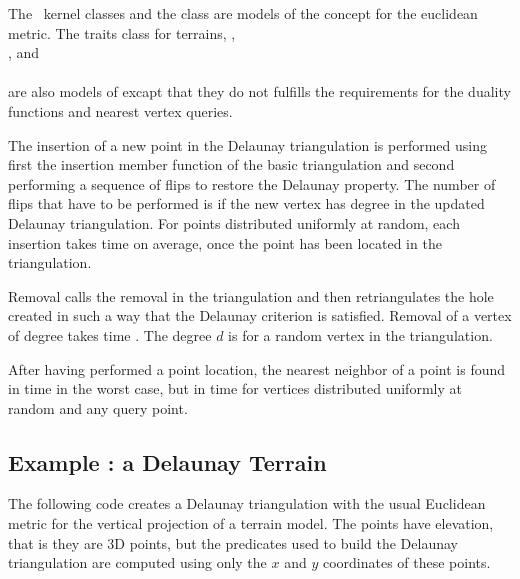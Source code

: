 The \cgal\  kernel classes 
 and the class 
are models of the concept 
for the euclidean metric.
The traits class for terrains,
,\\
, and\\
 \\
are also models of  
excapt that they do not fulfills 
the requirements for the duality functions and nearest vertex
queries.

The insertion of a new point in the Delaunay triangulation
is performed using first the insertion member function
of the basic triangulation and second 
performing a sequence of flips to restore the Delaunay property. 
The number of flips that have to be performed is 
if the new vertex has degree  in the updated
Delaunay triangulation. For
points distributed uniformly at random, 
each insertion takes time  on
average, once the point has been located in the triangulation.

Removal calls the removal in the triangulation and then retriangulates
the hole created in such a way that  the Delaunay criterion is
satisfied. Removal of a
vertex of degree  takes time .
The degree $d$ is  for a random
vertex in the triangulation.

After having performed a  point location, the
nearest neighbor of a point is found in time  in the
worst case, but in time 
for vertices distributed uniformly at random  and any query point. 


\subsection{Example : a Delaunay Terrain}
\label{Subsection_2D_Triangulations_Delaunay_Terrain}

The following code  creates a Delaunay triangulation with 
the usual Euclidean metric for the vertical projection of a 
terrain model. The points have elevation, that is they are 3D points,
but the predicates used to build the  Delaunay triangulation
are computed using only  the $x$ and $y$ coordinates  
of these points. 

